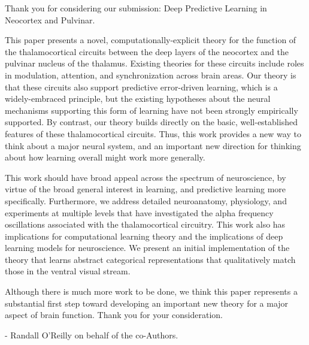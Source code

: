 Thank you for considering our submission: Deep Predictive Learning in Neocortex and Pulvinar.

This paper presents a novel, computationally-explicit theory for the function of the thalamocortical circuits between the deep layers of the neocortex and the pulvinar nucleus of the thalamus.  Existing theories for these circuits include roles in modulation, attention, and synchronization across brain areas.  Our theory is that these circuits also support predictive error-driven learning, which is a widely-embraced principle, but the existing hypotheses about the neural mechanisms supporting this form of learning have not been strongly empirically supported.  By contrast, our theory builds directly on the basic, well-established features of these thalamocortical circuits.  Thus, this work provides a new way to think about a major neural system, and an important new direction for thinking about how learning overall might work more generally.

This work should have broad appeal across the spectrum of neuroscience, by virtue of the broad general interest in learning, and predictive learning more specifically.  Furthermore, we address detailed neuroanatomy, physiology, and experiments at multiple levels that have investigated the alpha frequency oscillations associated with the thalamocortical circuitry.  This work also has implications for computational learning theory and the implications of deep learning models for neuroscience.  We present an initial implementation of the theory that learns abstract categorical representations that qualitatively match those in the ventral visual stream.

Although there is much more work to be done, we think this paper represents a substantial first step toward developing an important new theory for a major aspect of brain function.  Thank you for your consideration.

- Randall O'Reilly on behalf of the co-Authors.

